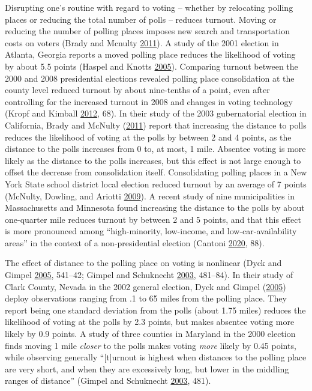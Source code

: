 \documentclass[
  12pt,
]{article}
\begin{document}
Disrupting one's routine with regard to voting -- whether by relocating polling places or reducing the total number of polls -- reduces turnout. Moving or reducing the number of polling places imposes new search and transportation costs on voters (Brady and Mcnulty \protect\hyperlink{ref-Brady2011}{2011}). A study of the 2001 election in Atlanta, Georgia reports a moved polling place reduces the likelihood of voting by about 5.5 points (Haspel and Knotts \protect\hyperlink{ref-Haspel2005}{2005}). Comparing turnout between the 2000 and 2008 presidential elections revealed polling place consolidation at the county level reduced turnout by about nine-tenths of a point, even after controlling for the increased turnout in 2008 and changes in voting technology (Kropf and Kimball \protect\hyperlink{ref-Kropf2012}{2012}, 68). In their study of the 2003 gubernatorial election in California, Brady and McNulty (\protect\hyperlink{ref-Brady2011}{2011}) report that increasing the distance to polls reduces the likelihood of voting at the polls by between 2 and 4 points, as the distance to the polls increases from 0 to, at most, 1 mile. Absentee voting is more likely as the distance to the polls increases, but this effect is not large enough to offset the decrease from consolidation itself. Consolidating polling places in a New York State school district local election reduced turnout by an average of 7 points (McNulty, Dowling, and Ariotti \protect\hyperlink{ref-McNulty2009}{2009}). A recent study of nine municipalities in Massachusetts and Minnesota found increasing the distance to the polls by about one-quarter mile reduces turnout by between 2 and 5 points, and that this effect is more pronounced among ``high-minority, ­low-income, and low-car-availability areas'' in the context of a non-presidential election (Cantoni \protect\hyperlink{ref-Cantoni2020}{2020}, 88).

The effect of distance to the polling place on voting is nonlinear (Dyck and Gimpel \protect\hyperlink{ref-Dyck2005}{2005}, 541--42; Gimpel and Schuknecht \protect\hyperlink{ref-Gimpel2003}{2003}, 481--84). In their study of Clark County, Nevada in the 2002 general election, Dyck and Gimpel (\protect\hyperlink{ref-Dyck2005}{2005}) deploy observations ranging from .1 to 65 miles from the polling place. They report being one standard deviation from the polls (about 1.75 miles) reduces the likelihood of voting at the polls by 2.3 points, but makes absentee voting more likely by 0.9 points. A study of three counties in Maryland in the 2000 election finds moving 1 mile \emph{closer} to the polls makes voting \emph{more} likely by 0.45 points, while observing generally ``{[}t{]}urnout is highest when distances to the polling place are very short, and when they are excessively long, but lower in the middling ranges of distance'' (Gimpel and Schuknecht \protect\hyperlink{ref-Gimpel2003}{2003}, 481).
\end{document}
